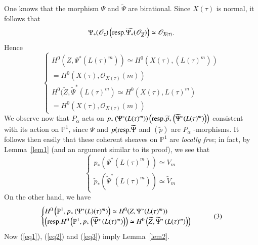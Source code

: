 \begin{Proof}
One knows that the morphism $\Psi$ and $\widetilde{\Psi}$ are birational. Since $X(\tau)$ is normal, it follows that 
$$
\Psi_{\ast}(\mathscr{O}_z)\left(\mathrm{resp.} \widetilde{\Psi_{\ast}}(\mathscr{O}_{\widetilde{Z}})\right) \simeq \mathscr{O}_{X(\tau)}.
$$
Hence
\begin{equation*}\label{eq1}
\begin{cases}
H^{0}(Z,\Psi^{\ast}\left(L(\tau)^{m}\right))\simeq H^{0}(X(\tau),(L(\tau)^{m}))\\
=H^{0}(X(\tau), \mathscr{O}_{X(\tau)}(m))\\
H^{0}(\widetilde{Z}, \widetilde{\Psi}^{\ast} (L(\tau)^{m})\simeq H^{0}(X(\tau),L(\tau)^{m})\\
=H^{0}(X(\tau), \mathscr{O}_{X(\tau)}(m))
\end{cases}\tag{1}
\end{equation*}
\pageoriginale
We observe now that $P_{\alpha}$ acts on $p_{\ast}\left(\Psi^{\ast}(L(\tau)^{m})\right)\left(\mathrm{resp.} \widetilde{p}_{\ast}\left(\widetilde{\Psi}^{\ast}(L(\tau)^{m})\right)\right)$ consistent with its action on $\mathbb{P}^{1}$, since $\Psi$ and $p (\mathrm{resp.} \widetilde{\Psi}$ and $(\widetilde{p})$ are $P_{\alpha}$ -morphisms. It follows then easily that these coherent sheaves on $\mathbb{P}^{1}$ are \textit{locally free}; in fact, by Lemma~\ref{lem1} (and an argument similar to its proof), we see that 
\begin{equation*}\label{eq2}
\begin{cases}
p_{\ast}\left(\Psi^{\ast}(L(\tau)^{m})\right) \simeq V_m\\
\widetilde{p}_{\ast} \left(\widetilde{\Psi}^{\ast}(L(\tau)^{m})\right)\simeq \widetilde{V}_m
\end{cases}\tag{2}
\end{equation*}
On the other hand, we have 
\begin{equation*}\label{eq3}
\begin{cases}
H^{0}\left(\mathbb{P}^{1}, p_{\ast}\left(\Psi^{\ast}(L)(\tau)^{m}\right)\right) \simeq H^{0}(Z, \Psi^{\ast}(L(\tau)^{m}))\\
\left(\mathrm{resp.} H^{0}\left(\mathbb{P}^{1}, p_{\ast}\left(\widetilde{\Psi}^{\ast}\left(L(\tau)^{m}\right)\right)\right) \simeq H^{0}\left(\widetilde{Z}, \widetilde{\Psi}^{\ast}\left(L(\tau)^{m}\right)\right)\right)
\end{cases}\tag{3}
\end{equation*}
Now (\ref{eq1}), (\ref{eq2}) and (\ref{eq3}) imply Lemma~\ref{lem2}.
\end{Proof}

